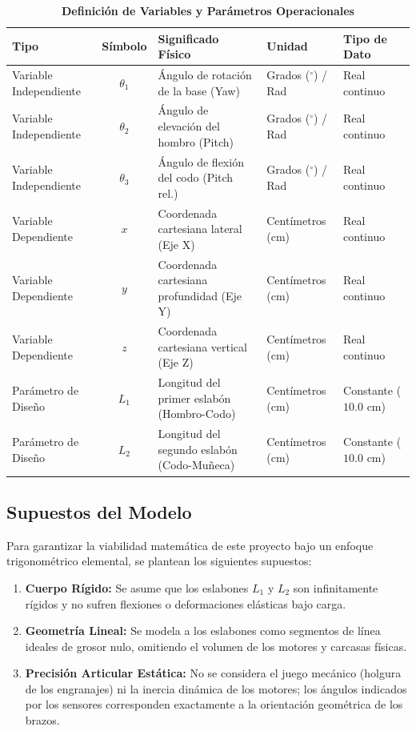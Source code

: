 \documentclass[11pt,a4paper]{article}
\begin{document}
\begin{table}[H]
\centering\small
\caption{\textbf{Definición de Variables y Parámetros Operacionales}}
\vspace{0.3cm}
\begin{tabularx}{\textwidth}{l c X l l}
\toprule
\textbf{Tipo} & \textbf{Símbolo} & \textbf{Significado Físico} & \textbf{Unidad} & \textbf{Tipo de Dato} \\
\midrule
Variable Independiente & $\theta_1$ & Ángulo de rotación de la base (Yaw) & Grados ($^\circ$) / Rad & Real continuo \\
Variable Independiente & $\theta_2$ & Ángulo de elevación del hombro (Pitch) & Grados ($^\circ$) / Rad & Real continuo \\
Variable Independiente & $\theta_3$ & Ángulo de flexión del codo (Pitch rel.) & Grados ($^\circ$) / Rad & Real continuo \\
\rowcolor{LightGray}
Variable Dependiente & $x$ & Coordenada cartesiana lateral (Eje X) & Centímetros (cm) & Real continuo \\
\rowcolor{LightGray}
Variable Dependiente & $y$ & Coordenada cartesiana profundidad (Eje Y) & Centímetros (cm) & Real continuo \\
\rowcolor{LightGray}
Variable Dependiente & $z$ & Coordenada cartesiana vertical (Eje Z) & Centímetros (cm) & Real continuo \\
Parámetro de Diseño & $L_1$ & Longitud del primer eslabón (Hombro-Codo) & Centímetros (cm) & Constante ($10.0$ cm) \\
Parámetro de Diseño & $L_2$ & Longitud del segundo eslabón (Codo-Muñeca) & Centímetros (cm) & Constante ($10.0$ cm) \\
\bottomrule
\end{tabularx}
\end{table}

\subsection{Supuestos del Modelo}
Para garantizar la viabilidad matemática de este proyecto bajo un enfoque trigonométrico elemental, se plantean los siguientes supuestos:
\begin{enumerate}
    \item \textbf{Cuerpo Rígido:} Se asume que los eslabones $L_1$ y $L_2$ son infinitamente rígidos y no sufren flexiones o deformaciones elásticas bajo carga.
    \item \textbf{Geometría Lineal:} Se modela a los eslabones como segmentos de línea ideales de grosor nulo, omitiendo el volumen de los motores y carcasas físicas.
    \item \textbf{Precisión Articular Estática:} No se considera el juego mecánico (holgura de los engranajes) ni la inercia dinámica de los motores; los ángulos indicados por los sensores corresponden exactamente a la orientación geométrica de los brazos.
\end{enumerate}
\end{document}
